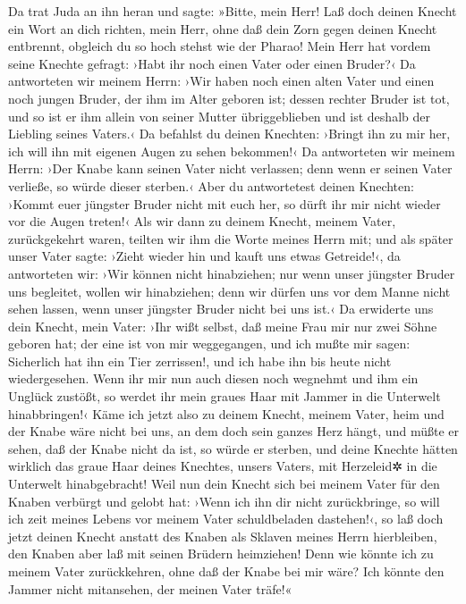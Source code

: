 Da trat Juda an ihn heran und sagte: »Bitte, mein Herr!
Laß doch deinen Knecht ein Wort an dich richten, mein Herr, ohne daß
dein Zorn gegen deinen Knecht entbrennt, obgleich du so hoch stehst wie
der Pharao!  Mein Herr hat vordem seine Knechte gefragt:
›Habt ihr noch einen Vater oder einen Bruder?‹  Da
antworteten wir meinem Herrn: ›Wir haben noch einen alten Vater und
einen noch jungen Bruder, der ihm im Alter geboren ist; dessen rechter
Bruder ist tot, und so ist er ihm allein von seiner Mutter
übriggeblieben und ist deshalb der Liebling seines Vaters.‹
 Da befahlst du deinen Knechten: ›Bringt ihn zu mir her,
ich will ihn mit eigenen Augen zu sehen bekommen!‹  Da
antworteten wir meinem Herrn: ›Der Knabe kann seinen Vater nicht
verlassen; denn wenn er seinen Vater verließe, so würde dieser sterben.‹
 Aber du antwortetest deinen Knechten: ›Kommt euer
jüngster Bruder nicht mit euch her, so dürft ihr mir nicht wieder vor
die Augen treten!‹  Als wir dann zu deinem Knecht, meinem
Vater, zurückgekehrt waren, teilten wir ihm die Worte meines Herrn mit;
 und als später unser Vater sagte: ›Zieht wieder hin und
kauft uns etwas Getreide!‹,  da antworteten wir: ›Wir
können nicht hinabziehen; nur wenn unser jüngster Bruder uns begleitet,
wollen wir hinabziehen; denn wir dürfen uns vor dem Manne nicht sehen
lassen, wenn unser jüngster Bruder nicht bei uns ist.‹ 
Da erwiderte uns dein Knecht, mein Vater: ›Ihr wißt selbst, daß meine
Frau mir nur zwei Söhne geboren hat;  der eine ist von
mir weggegangen, und ich mußte mir sagen: Sicherlich hat ihn ein Tier
zerrissen!, und ich habe ihn bis heute nicht wiedergesehen.
 Wenn ihr mir nun auch diesen noch wegnehmt und ihm ein
Unglück zustößt, so werdet ihr mein graues Haar mit Jammer in die
Unterwelt hinabbringen!‹  Käme ich jetzt also zu deinem
Knecht, meinem Vater, heim und der Knabe wäre nicht bei uns, an dem doch
sein ganzes Herz hängt,  und müßte er sehen, daß der
Knabe nicht da ist, so würde er sterben, und deine Knechte hätten
wirklich das graue Haar deines Knechtes, unsers Vaters, mit Herzeleid✲
in die Unterwelt hinabgebracht!  Weil nun dein Knecht
sich bei meinem Vater für den Knaben verbürgt und gelobt hat: ›Wenn ich
ihn dir nicht zurückbringe, so will ich zeit meines Lebens vor meinem
Vater schuldbeladen dastehen!‹,  so laß doch jetzt deinen
Knecht anstatt des Knaben als Sklaven meines Herrn hierbleiben, den
Knaben aber laß mit seinen Brüdern heimziehen!  Denn wie
könnte ich zu meinem Vater zurückkehren, ohne daß der Knabe bei mir
wäre? Ich könnte den Jammer nicht mitansehen, der meinen Vater träfe!«

